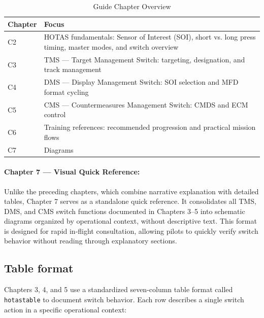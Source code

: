 \documentclass[11pt, a4paper, twoside]{report}
\begin{document}
\begin{table}[H]
	\centering
	\caption{Guide Chapter Overview}
	\label{tab:C1-chapter-overview}
	\small
	\renewcommand{\arraystretch}{1.25}
	\begin{tabular}{C{1.5cm} L{12.0cm}}
		\toprule
		\textbf{Chapter} & \textbf{Focus} \\
		\midrule
		C2 & HOTAS fundamentals: Sensor of Interest (SOI), short vs. long press timing, master modes, and switch overview \\
		C3 & TMS --- Target Management Switch: targeting, designation, and track management \\
		C4 & DMS --- Display Management Switch: SOI selection and MFD format cycling \\
		C5 & CMS --- Countermeasures Management Switch: CMDS and ECM control \\
		C6 & Training references: recommended progression and practical mission flows \\
		C7 & Diagrams \\
		\bottomrule
	\end{tabular}
\end{table}

\paragraph{Chapter 7 --- Visual Quick Reference:}
Unlike the preceding chapters, which combine narrative explanation with detailed tables, Chapter 7 serves as a standalone quick reference. It consolidates all TMS, DMS, and CMS switch functions documented in Chapters 3--5 into schematic diagrams organized by operational context, without descriptive text. This format is designed for rapid in-flight consultation, allowing pilots to quickly verify switch behavior without reading through explanatory sections.

\subsection{Table format}
\label{sec:C1-S3-S2}

Chapters 3, 4, and 5 use a standardized seven-column table format called \texttt{hotastable} to document switch behavior. Each row describes a single switch action in a specific operational context:
\end{document}
